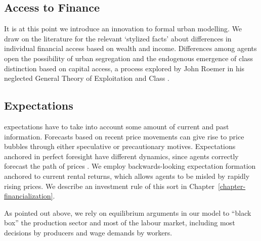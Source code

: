 \subsection{Access to Finance}
It is at this point we introduce an innovation to formal urban modelling. We draw on the literature for the relevant `\gls{stylized facts}' about differences in individual financial access based on wealth and income. Differences among agents open the possibility of urban segregation and the endogenous emergence of \gls{class} distinction based on capital access, a process explored by John Roemer in his neglected General Theory of Exploitation and Class \cite{roemerGeneralTheoryExploitation1982}.  

\subsection{Expectations}
\Glspl{expectation} have to take into account some amount of current and past information. Forecasts based on recent price movements can give rise to \glspl{price bubble} through either speculative or precautionary motives. Expectations anchored in \gls{perfect foresight} have different dynamics, since agents correctly forecast the path of prices \cite{muthRationalExpectationsTheory1961}. We employ backwards-looking expectation formation anchored 
to current rental returns, which allows agents to be misled by rapidly rising prices. We describe an investment rule of this sort in Chapter~\ref{chapter-financialization}. 


As pointed out above, we rely on equilibrium arguments in our model to ``black box'' the production sector and most of the labour market, including most decisions by producers and wage demands by workers.  




